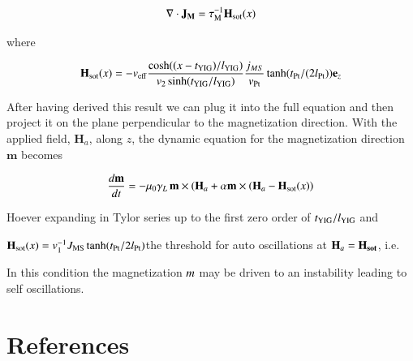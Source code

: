 \documentclass[review]{elsarticle}
\begin{document}
\begin{equation}
\nabla \cdot \mathbf{J}_{\mathbf{M}} = \tau^{-1}_{{\mathrm{\tiny{M}}}}\mathbf{H}_{\mathrm{\tiny{sot}}}(x)
\end{equation}

where 

\begin{equation}
\mathbf{H}_{\mathrm{\tiny{sot}}}(x) = - v_{\mathrm{\tiny{eff}}} \frac{\cosh((x-t_{\mathrm{\tiny{YIG}}})/l_{\mathrm{\tiny{YIG}}})}{v_2 \sinh(t_{\mathrm{\tiny{YIG}}}/l_{\mathrm{\tiny{YIG}}})} \frac{j_{MS}}{v_{\mathrm{\tiny{Pt}}}} \tanh(t_{\mathrm{\tiny{Pt}}}/(2 l_{\mathrm{\tiny{Pt}}}))\mathbf{e}_z
\end{equation}


 After having derived this result we can plug it into the full equation and then project it on the plane perpendicular to the magnetization direction. With the applied field, $\mathbf{H}_{a}$, along $z$, the dynamic equation for the magnetization direction $\mathbf{m} $ becomes

\begin{equation}
\frac{d \mathbf{m}}{d t} =  - \mu_0\gamma_L \, \mathbf{m} \times \left( \mathbf{H}_{a} + \alpha \mathbf{m} \times( \mathbf{H}_{a} -  \mathbf{H}_{\mathrm{\tiny{sot}}}(x)\right)
\end{equation}

 Hoever expanding in Tylor series up to the first zero order of $t_{\mathrm{\tiny{YIG}}}/l_{\mathrm{\tiny{YIG}}}$  and 
 
 $\mathbf{H}_{\mathrm{\tiny{sot}}}(x) =v_1^{-1} J_{\mathrm{\tiny{MS}}}\tanh(t_{\mathrm{\tiny{Pt}}}/2 l_{\mathrm{\tiny{Pt}}})
$the threshold for auto oscillations at 
 $\mathbf{H}_{a}=\mathbf{H}_{\mathbf{\tiny{sot}}}$, i.e.


In this condition the magnetization $\boldmath{m}$  may be driven to an instability leading to self oscillations.  


\section*{References}


\end{document}
